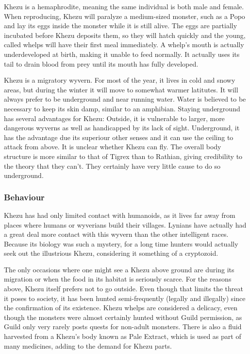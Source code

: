 Khezu is a hemaphrodite, meaning the same individual is both male and female. When reproducing, Khezu will paralyze a medium-sized monster, such as a Popo and lay its eggs inside the monster while it is still alive. The eggs are partially incubated before Khezu deposits them, so they will hatch quickly and the young, called whelps will have their first meal immediately. A whelp's mouth is actually underdeveloped at birth, making it unable to feed normally. It actually uses its tail to drain blood from prey until its mouth has fully developed.

Khezu is a migratory wyvern. For most of the year, it lives in cold and snowy areas, but during the winter it will move to somewhat warmer latitutes. It will always prefer to be underground and near running water. Water is believed to be necessary to keep its skin damp, similar to an amphibian. Staying underground has several advantages for Khezu: Outside, it is vulnerable to larger, more dangerous wyverns as well as handicapped by its lack of sight. Underground, it has the advantage due its superiour other senses and it can use the ceiling to attack from above. It is unclear whether Khezu can fly. The overall body structure is more similar to that of Tigrex than to Rathian, giving credibility to the theory that they can't. They certainly have very little cause to do so underground.

\subsubsection{Behaviour}
Khezu has had only limited contact with humanoids, as it lives far away from places where humans or wyverians build their villages. Lynians have actually had a great deal more contact with this wyvern than the other intelligent races. Because its biology was such a mystery, for a long time hunters would actually seek out the illustrious Khezu, considering it something of a cryptozoid.

The only occasions where one might see a Khezu above ground are during its migration or when the food in its habitat is seriously scarce. For the reasons above, Khezu itself prefers not to go outside. Even though that limits the threat it poses to society, it has been hunted semi-frequently (legally and illegally) since the confirmation of its existence. Khezu whelps are considered a delicacy, even though the monsters were almost certainly hunted without Guild permission, as Guild only very rarely posts quests for non-adult monsters. There is also a fluid harvested from a Khezu's body known as Pale Extract, which is used as part of many medicines, adding to the demand for Khezu parts.


